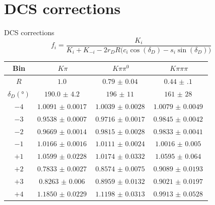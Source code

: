 \documentclass{beamer}
\begin{document}
\section{DCS corrections}
\begin{frame}{DCS corrections}
  \begin{equation*}
    f_i = \frac{K_i}{K_i + K_{-i} - 2r_DR\big(c_i\cos(\delta_D) - s_i\sin(\delta_D)\big)}
  \end{equation*}
  \centering
  \def\arraystretch{1.2}%
  \begin{tabular}{c|ccc}
    Bin                         & $K\pi$               & $K\pi\pi^0$          & $K\pi\pi\pi$         \\
    \hline
    $R$                         & $\SI{1.0}{}$         & $\SI{0.79(4)}{}$     & $\SI{0.44(10)}{}$    \\
    $\delta_D(\si{\degree})$    & $\SI{190.0(42)}{}$   & $\SI{196(11)}{}$     & $\SI{161(28)}{}$     \\
    \hline
    $-4$                        & $\SI{1.0091(17)}{}$  & $\SI{1.0039(28)}{}$  & $\SI{1.0079(49)}{}$  \\
    $-3$                        & $\SI{0.9538(7)}{}$   & $\SI{0.9716(17)}{}$  & $\SI{0.9845(42)}{}$  \\
    $-2$                        & $\SI{0.9669(14)}{}$  & $\SI{0.9815(28)}{}$  & $\SI{0.9833(41)}{}$  \\
    $-1$                        & $\SI{1.0166(16)}{}$  & $\SI{1.0111(24)}{}$  & $\SI{1.0016(50)}{}$  \\
    $+1$                        & $\SI{1.0599(228)}{}$ & $\SI{1.0174(332)}{}$ & $\SI{1.0595(640)}{}$ \\
    $+2$                        & $\SI{0.7833(27)}{}$  & $\SI{0.8574(75)}{}$  & $\SI{0.9089(193)}{}$ \\
    $+3$                        & $\SI{0.8263(60)}{}$  & $\SI{0.8959(132)}{}$ & $\SI{0.9021(197)}{}$ \\
    $+4$                        & $\SI{1.1850(229)}{}$ & $\SI{1.1198(313)}{}$ & $\SI{0.9913(528)}{}$ \\
    \hline
  \end{tabular}
\end{frame}
\end{document}
